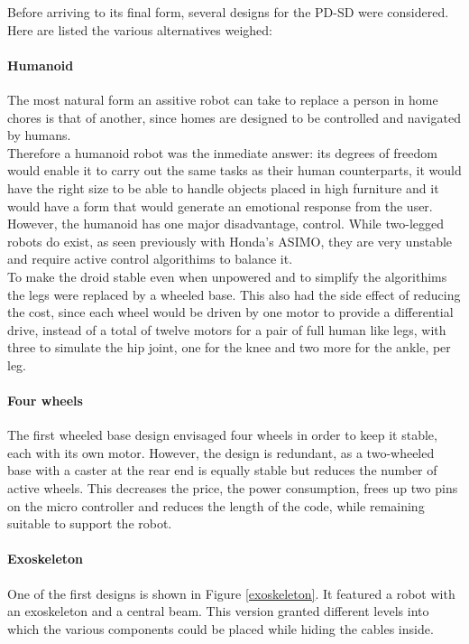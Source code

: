 Before arriving to its final form, several designs for the PD-SD were considered. Here are listed the various alternatives weighed:

\paragraph{Humanoid} The most natural form an assitive robot can take to replace a person in home chores is that of another, since homes are designed to be controlled and navigated by humans. \\

Therefore a humanoid robot was the inmediate answer: its degrees of freedom would enable it to carry out the same tasks as their human counterparts, it would have the right size to be able to handle objects placed in high furniture and it would have a form that would generate an emotional response from the user.\\

However, the humanoid has one major disadvantage, control. While two-legged robots do exist, as seen previously with Honda's ASIMO, they are very unstable and require active control algorithims to balance it. \\

To make the droid stable even when unpowered and to simplify the algorithims the legs were replaced by a wheeled base. This also had the side effect of reducing the cost, since each wheel would be driven by one motor to provide a differential drive, instead of a total of twelve motors for a pair of full human like legs, with three to simulate the hip joint, one for the knee and two more for the ankle, per leg.\\


\paragraph{Four wheels} The first wheeled base design envisaged four wheels in order to keep it stable, each with its own motor. However, the design is redundant, as a two-wheeled base with a caster at the rear end is equally stable but reduces the number of active wheels. This decreases the price, the power consumption, frees up two pins on the micro controller and reduces the length of the code, while remaining suitable to support the robot.


\paragraph{Exoskeleton} One of the first designs is shown in Figure \ref{exoskeleton}. It featured a robot with an exoskeleton and a central beam. This version granted different levels into which the various components could be placed while hiding the cables inside. \\

